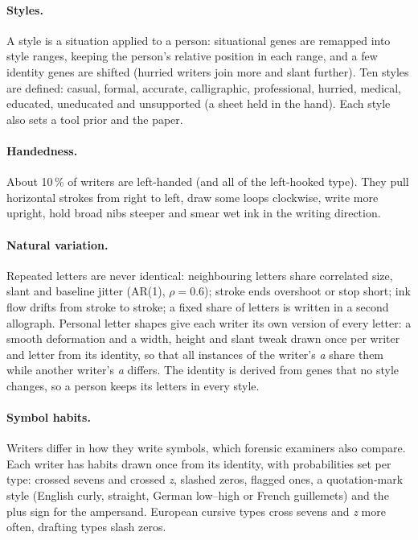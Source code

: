 \documentclass[10pt,twocolumn]{article}
\begin{document}
\paragraph{Styles.} A style is a situation applied to a person: situational genes are remapped into style ranges,
keeping the person's relative position in each range, and a few identity genes are shifted (hurried writers join
more and slant further). Ten styles are defined: casual, formal, accurate, calligraphic, professional, hurried,
medical, educated, uneducated and unsupported (a sheet held in the hand). Each style also sets a tool prior and
the paper.

\paragraph{Handedness.} About 10\,\% of writers are left-handed (and all of the left-hooked type). They pull
horizontal strokes from right to left, draw some loops clockwise, write more upright, hold broad nibs steeper and
smear wet ink in the writing direction.

\paragraph{Natural variation.} Repeated letters are never identical: neighbouring letters share correlated
size, slant and baseline jitter (AR(1), $\rho=0.6$); stroke ends overshoot or stop short; ink flow drifts from
stroke to stroke; a fixed share of letters is written in a second allograph. Personal letter shapes give each
writer its own version of every letter: a smooth deformation and a width, height and slant tweak drawn once per
writer and letter from its identity, so that all instances of the writer's \emph{a} share them while another
writer's \emph{a} differs. The identity is derived from genes that no style changes, so a person keeps its letters
in every style.

\paragraph{Symbol habits.} Writers differ in how they write symbols, which forensic examiners also compare. Each
writer has habits drawn once from its identity, with probabilities set per type: crossed sevens and crossed
\emph{z}, slashed zeros, flagged ones, a quotation-mark style (English curly, straight, German low--high or French guillemets)
and the plus sign for the ampersand. European cursive types cross sevens and \emph{z} more often, drafting types
slash zeros.
\end{document}
